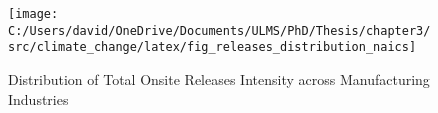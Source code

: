 \begin{figure}[H]
    \centering
    \texttt{[image: C:/Users/david/OneDrive/Documents/ULMS/PhD/Thesis/chapter3/src/climate\_change/latex/fig\_releases\_distribution\_naics]}
    \caption{Distribution of Total Onsite Releases Intensity across Manufacturing Industries}
    \label{fig:releases-distribution-naics}
\end{figure}